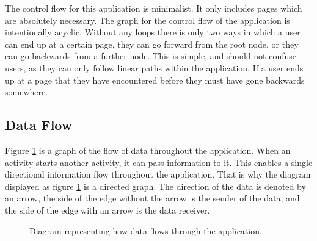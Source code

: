 \documentclass{article}
\begin{document}
The control flow for this application is minimalist. It only includes pages which are absolutely necessary. The graph for the control flow of the application is intentionally acyclic. Without any loops there is only two ways in which a user can end up at a certain page, they can go forward from the root node, or they can go backwards from a further node. This is simple, and should not confuse users, as they can only follow linear paths within the application. If a user ends up at a page that they have encountered before they must have gone backwards somewhere. \par

\subsection{Data Flow}

Figure \ref{figure:applicationDataFlow} is a graph of the flow of data throughout the application. When an activity starts another activity, it can pass information to it. This enables a single directional information flow throughout the application. That is why the diagram displayed as figure \ref{figure:applicationDataFlow} is a directed graph. The direction of the data is denoted by an arrow, the side of the edge without the arrow is the sender of the data, and the side of the edge with an arrow is the data receiver. 

\begin{figure}[H]
\centering
{}
\caption{Diagram representing how data flows through the application.}
\label{figure:applicationDataFlow}
\end{figure}
\end{document}

